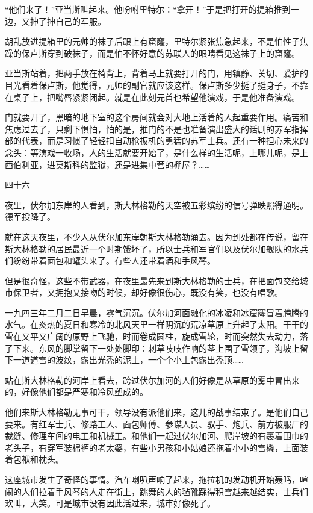 “他们来了！”亚当斯叫起来。他吩咐里特尔：“拿开！”于是把打开的提箱推到一边，又抻了抻自己的军服。

胡乱放进提箱里的元帅的袜子后跟上有窟窿，里特尔紧张焦急起来，不是怕性子焦躁的保卢斯穿到破袜子，而是怕不怀好意的苏联人的眼睛看见这袜子上的窟窿。

亚当斯站着，把两手放在椅背上，背着马上就要打开的门，用镇静、关切、爱护的目光看着保卢斯，他觉得，元帅的副官就应该这样。保卢斯多少挺了挺身子，不靠在桌子上，把嘴唇紧紧闭起。就是在此刻元首也希望他演戏，于是他准备演戏。

门就要开了，黑暗的地下室的这个房间就会对大地上活着的人起重要作用。痛苦和焦虑过去了，只剩下惧怕，怕的是，推门的不是也准备演出盛大的话剧的苏军指挥部的代表，而是习惯了轻轻扣自动枪扳机的勇猛的苏军士兵。还有一种担心未来的念头：等演戏一收场，人的生活就要开始了，是什么样的生活呢，上哪儿呢，是上西伯利亚，进莫斯科的监狱，还是进集中营的棚屋？……

四十六

夜里，伏尔加东岸的人看到，斯大林格勒的天空被五彩缤纷的信号弹映照得通明。德军投降了。

就在这天夜里，不少人从伏尔加东岸朝斯大林格勒涌去。因为到处都在传说，留在斯大林格勒的居民最近一个时期饿坏了，所以士兵和军官们以及伏尔加舰队的水兵们纷纷带着面包和罐头来了。有些人还带着酒和手风琴。

但是很奇怪，这些不带武器，在夜里最先来到斯大林格勒的士兵，在把面包交给城市保卫者，又拥抱又接吻的时候，却好像很伤心，既没有笑，也没有唱歌。

一九四三年二月二日早晨，雾气沉沉。伏尔加河面融化的冰凌和冰窟窿冒着腾腾的水气。在炎热的夏日和寒冷的北风天里一样阴沉的荒凉草原上升起了太阳。干干的雪在又平又广阔的原野上飞驰，时而卷成圆柱，旋成雪轮，时而突然失去动力，落了下来。东风的脚掌留下一处处脚印：刺草吱吱作响的茎上围了雪领子，沟坡上留下一道道雪的波纹，露出光秃的泥土，一个个小土包露出秃顶……

站在斯大林格勒的河岸上看去，跨过伏尔加河的人们好像是从草原的雾中冒出来的，好像他们都是严寒和冷风塑成的。

他们来斯大林格勒无事可干，领导没有派他们来，这儿的战事结束了。是他们自己要来。有红军士兵、修路工人、面包师傅、参谋人员、驭手、炮兵、前方被服厂的裁缝、修理车间的电工和机械工。和他们一起过伏尔加河、爬岸坡的有裹着围巾的老头子，有穿军装棉裤的老太婆，有些小男孩和小姑娘还拖着小小的雪橇，上面装着包袱和枕头。

这座城市发生了奇怪的事情。汽车喇叭声响了起来，拖拉机的发动机开始轰鸣，喧闹的人们拉着手风琴的人走在街上，跳舞的人的毡靴踩得积雪越来越结实，士兵们欢叫，大笑。可是城市没有因此活过来，城市好像死了。

